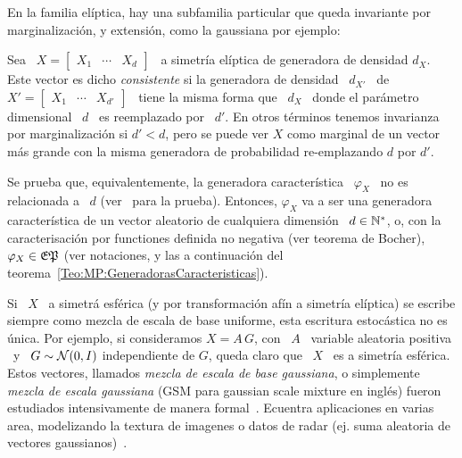 En la familia el\'iptica, hay una subfamilia particular que queda invariante por
marginalizaci\'on, y extensi\'on, como la gaussiana por ejemplo:
%
\begin{definicion}
%
  Sea \  $X = \begin{bmatrix} X_1 &  \cdots & X_d \end{bmatrix}$  \ a simetr\'ia
  el\'iptica  de  generadora de  densidad  $d_X$.   Este  vector es  dicho  {\em
    consistente}   si  la   generadora  de   densidad  \   $d_{X'}$  \   de  $X'
  = \begin{bmatrix} X_1 & \cdots &  X_{d'} \end{bmatrix}$ \ tiene la misma forma
  que \ $d_X$  \ donde el par\'ametro  dimensional \ $d$ \ es  reemplazado por \
  $d'$.  En  otros t\'erminos tenemos  invarianza por marginalizaci\'on si  $d' <
  d$, pero se puede ver $X$ como marginal de un vector m\'as grande con la misma
  generadora de probabilidad re-emplazando $d$ por $d'$.

  Se prueba que, equivalentemente,  la generadora caracter\'istica \ $\varphi_X$
  \  no es  relacionada a  \ $d$  (ver~\cite{Kan94, FanKot90}  para  la prueba).
  Entonces, $\varphi_X$  va a ser  una generadora caracter\'istica de  un vector
  aleatorio   de  cualquiera   dimensi\'on  \   $d  \in   \mathbb{N}^*$,  o,   con  la
  caracterisaci\'on por functiones definida no negativa (ver teorema de Bocher),
  \  $\varphi_X  \in  \mathfrak{EP}$  (ver   notaciones,  y  las  a  continuaci\'on  del
  teorema~\ref{Teo:MP:GeneradorasCaracteristicas}).
\end{definicion}


Si \  $X$ \ a simetr\'a  esf\'erica (y por transformaci\'on  af\'in a simetr\'ia
el\'iptica)  se escribe siempre  como mezcla  de escala  de base  uniforme, esta
escritura estoc\'astica  no es \'unica. Por  ejemplo, si consideramos $X  = A \,
G$, con \ $A$ \ variable aleatoria positiva \ y \ $G \sim \mathcal{N}(0,I)$ independiente
de $G$,  queda claro  que \ $X$  \ es  a simetr\'ia esf\'erica.  Estos vectores,
llamados {\em mezcla de escala de  base gaussiana}, o simplemente {\em mezcla de
  escala  gaussiana}  (GSM  para  gaussian  scale mixture  en  ingl\'es)  fueron
estudiados  intensivamente de  manera formal~\cite{Kan94,  Yao73,  Ver64, Pic70,
  Kel71,  Kin72, KeiSte74,  Tei60, AndMal74}.   Ecuentra aplicaciones  en varias
area, modelizando la  textura de imagenes o datos de  radar (ej.  suma aleatoria
de  vectores gaussianos)~\cite{PorStr03,  BomBea08,  Sel08, ShiSel07,  ZozVig10,
  TisNic04, TodTab07}.


